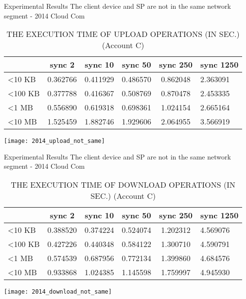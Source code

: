 \begin{frame}{Experimental Results}
{The client device and SP are \alert{not} in the same network segment - 2014 Cloud Com}
	\scriptsize
    \begin{table}[]
    \centering
    \caption{THE EXECUTION TIME OF \alert{UPLOAD} OPERATIONS (IN SEC.) (Account C)}
    \begin{tabular}{lccccl}
                         & sync 2   & sync 10  & sync 50  & sync 250 & sync 1250 \\ \hline
        \textless 10 KB  & 0.362766 & 0.411929 & 0.486570 & 0.862048 & 2.363091  \\ \hline
        \textless 100 KB & 0.377788 & 0.416367 & 0.508769 & 0.870478 & 2.453335  \\ \hline
        \textless 1 MB   & 0.556890 & 0.619318 & 0.698361 & 1.024154 & 2.665164  \\ \hline
        \textless 10 MB  & 1.525459 & 1.882746 & 1.929606 & 2.064955 & 3.566919  \\ \hline
    \end{tabular}
    \end{table}
    \begin{center}
		\texttt{[image: 2014\_upload\_not\_same]}
    \end{center}
\end{frame}

\begin{frame}{Experimental Results}
{The client device and SP are \alert{not} in the same network segment - 2014 Cloud Com}
	\scriptsize
    \begin{table}[]
    \centering
    \caption{THE EXECUTION TIME OF \alert{DOWNLOAD} OPERATIONS (IN SEC.) (Account C)}
    \begin{tabular}{lccccl}
                         & sync 2   & sync 10  & sync 50  & sync 250 & sync 1250 \\ \hline
        \textless 10 KB  & 0.388520 & 0.374224 & 0.524074 & 1.202312 & 4.569076  \\ \hline
        \textless 100 KB & 0.427226 & 0.440348 & 0.584122 & 1.300710 & 4.590791  \\ \hline
        \textless 1 MB   & 0.574539 & 0.687956 & 0.772134 & 1.399860 & 4.684576  \\ \hline
        \textless 10 MB  & 0.933868 & 1.024385 & 1.145598 & 1.759997 & 4.945930  \\ \hline
    \end{tabular}
    \end{table}
    \begin{center}
		\texttt{[image: 2014\_download\_not\_same]}
    \end{center}
\end{frame}

